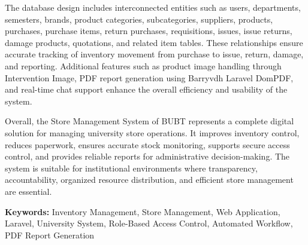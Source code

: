 The database design includes interconnected entities such as users, departments, semesters, brands, product categories, subcategories, suppliers, products, purchases, purchase items, return purchases, requisitions, issues, issue returns, damage products, quotations, and related item tables. These relationships ensure accurate tracking of inventory movement from purchase to issue, return, damage, and reporting. Additional features such as product image handling through Intervention Image, PDF report generation using Barryvdh Laravel DomPDF, and real-time chat support enhance the overall efficiency and usability of the system.

Overall, the Store Management System of BUBT represents a complete digital solution for managing university store operations. It improves inventory control, reduces paperwork, ensures accurate stock monitoring, supports secure access control, and provides reliable reports for administrative decision-making. The system is suitable for institutional environments where transparency, accountability, organized resource distribution, and efficient store management are essential.

\vfill

\textbf{Keywords:} Inventory Management, Store Management, Web Application, Laravel, University System, Role-Based Access Control, Automated Workflow, PDF Report Generation